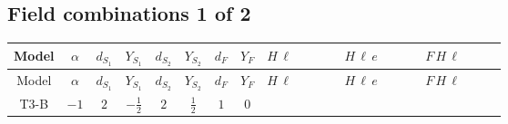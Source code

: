 \documentclass[8pt]{article}
\begin{document}
\begin{landscape}
\subsection*{Field combinations 1 of 2}
\begin{longtable}{@{}cccccccc >{\raggedright\arraybackslash}p{0.21\linewidth} >{\raggedright\arraybackslash}p{0.21\linewidth} >{\raggedright\arraybackslash}p{0.21\linewidth}@{}}
\toprule
Model & $\alpha$ & $d_{S_1}$ & $Y_{S_1}$ & $d_{S_2}$ & $Y_{S_2}$ & $d_F$ & $Y_F$ & $H\,\ell$ & $H\,\ell\,e$ & $F\,H\,\ell$ \\
\midrule
\endfirsthead
\toprule
Model & $\alpha$ & $d_{S_1}$ & $Y_{S_1}$ & $d_{S_2}$ & $Y_{S_2}$ & $d_F$ & $Y_F$ & $H\,\ell$ & $H\,\ell\,e$ & $F\,H\,\ell$ \\
\midrule
\endhead
T3-B & $-1$ & $2$ & $-\frac{1}{2}$ & $2$ & $\frac{1}{2}$ & $1$ & $0$ & \scriptsize\adjustbox{max width=\linewidth}{$\begin{gathered} +\frac{2 \hbar  \overline{y_{1,i_1,r_1}} \overline{y_{2,i_2,r_1}} L_{a_4,i_2}{}^T\, C\, P_L\, L_{a_2,i_1} H_{a_1} H_{a_3} \lambda_5 \epsilon_{a_1,a_2} \epsilon_{a_3,a_4}}{\sqrt{3} \epsilon  M_F} \\ +\frac{2 \hbar  \overline{y_{1,i_1,r_1}} \overline{y_{2,i_2,r_1}} L_{a_4,i_2}{}^T\, C\, P_L\, L_{a_2,i_1} H_{a_1} H_{a_3} \lambda_5 \epsilon_{a_1,a_2} \epsilon_{a_3,a_4}}{\sqrt{3} M_F} \\ +\frac{2 \hbar  \overline{\lambda_5} \overline{L_{a_3,i_1}}\, C\, P_R\, \overline{L_{a_4,i_2}}{}^T y_{1,i_1,r_1} y_{2,i_2,r_1} \epsilon_{a_1,a_3} \epsilon_{a_2,a_4} H_{a_1}{}^{\dagger } H_{a_2}{}^{\dagger }}{\sqrt{3} \epsilon  M_F}\end{gathered}$} & \scriptsize\adjustbox{max width=\linewidth}{$\begin{gathered} \frac{\hbar  \overline{y_{1,i_3,r_1}} \overline{L_{a_1,i_2}}\, P_R\, e_{i_1} H_{a_1} y_{1,i_2,r_1} Y_{e,i_3,i_1}}{4 \epsilon } \\ +\frac{3}{8} \hbar  \overline{y_{1,i_3,r_1}} \overline{L_{a_1,i_2}}\, P_R\, e_{i_1} H_{a_1} y_{1,i_2,r_1} Y_{e,i_3,i_1} \\ +\frac{\hbar  \overline{y_{2,i_3,r_1}} \overline{L_{a_1,i_2}}\, P_R\, e_{i_1} H_{a_1} y_{2,i_2,r_1} Y_{e,i_3,i_1}}{4 \epsilon }\end{gathered}$} & \scriptsize\adjustbox{max width=\linewidth}{$\begin{gathered} +\frac{2 \hbar  \log \left(\frac{\bar{\mu}^{2}}{M_F^2}\right) \overline{y_{1,i_1,r_1}} \overline{y_{2,i_2,r_1}} L_{a_4,i_2}{}^T\, C\, P_L\, L_{a_2,i_1} H_{a_1} H_{a_3} \lambda_5 \epsilon_{a_1,a_2} \epsilon_{a_3,a_4}}{\sqrt{3} M_F} \\ +\frac{2 \hbar  \log \left(\frac{\bar{\mu}^{2}}{M_F^2}\right) \overline{\lambda_5} \overline{L_{a_3,i_1}}\, C\, P_R\, \overline{L_{a_4,i_2}}{}^T y_{1,i_1,r_1} y_{2,i_2,r_1} \epsilon_{a_1,a_3} \epsilon_{a_2,a_4} H_{a_1}{}^{\dagger } H_{a_2}{}^{\dagger }}{\sqrt{3} M_F}\end{gathered}$} \\

\end{longtable}
\end{landscape}
\end{document}
